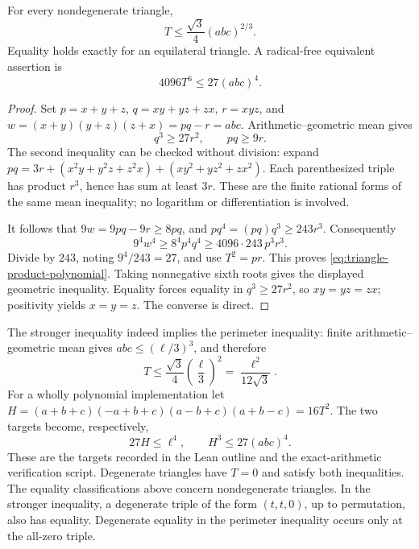 \begin{theorem}
\label{thm:triangle-product}
For every nondegenerate triangle,
\[
 T\leq\frac{\sqrt3}{4}(abc)^{2/3}.
\]
Equality holds exactly for an equilateral triangle. A radical-free
equivalent assertion is
\begin{equation}\label{eq:triangle-product-polynomial}
 4096T^6\leq27(abc)^4.
\end{equation}
\end{theorem}
\begin{proof}
Set \(p=x+y+z\), \(q=xy+yz+zx\), \(r=xyz\), and
\(w=(x+y)(y+z)(z+x)=pq-r=abc\).
Arithmetic--geometric mean gives
\[
 q^3\geq27r^2,\qquad pq\geq9r.
\]
The second inequality can be checked without division: expand
\(pq=3r+(x^2y+y^2z+z^2x)+(xy^2+yz^2+zx^2)\).
Each parenthesized triple has product \(r^3\), hence has sum at
least \(3r\). These are the finite rational forms of the same mean
inequality; no logarithm or differentiation is involved.

It follows that \(9w=9pq-9r\geq8pq\), and
\(pq^4=(pq)q^3\geq243r^3\). Consequently
\[
 9^4w^4\geq8^4p^4q^4
 \geq4096\cdot243\,p^3r^3.
\]
Divide by \(243\), noting \(9^4/243=27\), and use
\(T^2=pr\). This proves \eqref{eq:triangle-product-polynomial}.
Taking nonnegative sixth roots gives the displayed geometric inequality.
Equality forces equality in \(q^3\geq27r^2\), so
\(xy=yz=zx\); positivity yields \(x=y=z\). The converse is direct.
\end{proof}

The stronger inequality indeed implies the perimeter inequality: finite
arithmetic--geometric mean gives \(abc\leq(\ell/3)^3\), and therefore
\[
 T\leq\frac{\sqrt3}{4}\left(\frac\ell3\right)^2
 =\frac{\ell^2}{12\sqrt3}.
\]
For a wholly polynomial implementation let
\(H=(a+b+c)(-a+b+c)(a-b+c)(a+b-c)=16T^2\).
The two targets become, respectively,
\[
 27H\leq\ell^4,\qquad H^3\leq27(abc)^4.
\]
These are the targets recorded in the Lean outline and the exact-arithmetic
verification script. Degenerate triangles have \(T=0\) and satisfy both
inequalities. The equality classifications above concern nondegenerate
triangles. In the stronger inequality, a degenerate triple of the form
\((t,t,0)\), up to permutation, also has equality. Degenerate equality
in the perimeter inequality occurs only at the all-zero triple.


